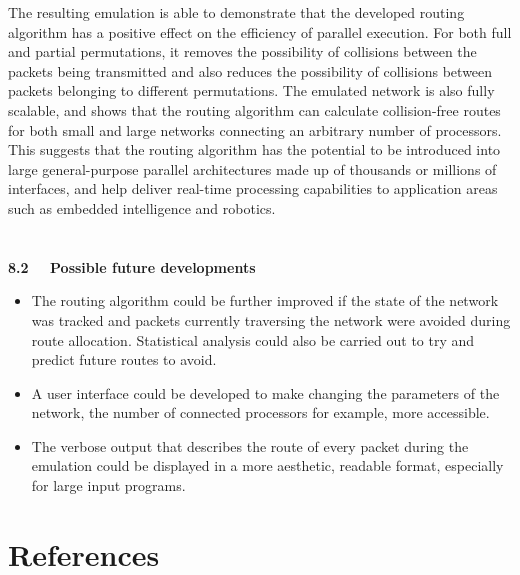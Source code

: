 \documentclass[a4paper, 12pt]{article}
\begin{document}
The resulting emulation is able to demonstrate that the developed routing algorithm has a positive effect on the efficiency of parallel execution. For both full and partial permutations, it removes the possibility of collisions between the packets being transmitted and also reduces the possibility of collisions between packets belonging to different permutations. The emulated network is also fully scalable, and shows that the routing algorithm can calculate collision-free routes for both small and large networks connecting an arbitrary number of processors. This suggests that the routing algorithm has the potential to be introduced into large general-purpose parallel architectures made up of thousands or millions of interfaces, and help deliver real-time processing capabilities to application areas such as embedded intelligence and robotics.\\ \ \\ \ \\
\noindent\textbf{\large 8.2 \ \ Possible future developments}
\vspace{-1mm}
\begin{itemize}[leftmargin=*]
	\item The routing algorithm could be further improved if the state of the network was tracked and packets currently traversing the network were avoided during route allocation. Statistical analysis could also be carried out to try and predict future routes to avoid.
	\item A user interface could be developed to make changing the parameters of the network, the number of connected processors for example, more accessible.
	\item The verbose output that describes the route of every packet during the emulation could be displayed in a more aesthetic, readable format, especially for large input programs. 
\end{itemize}

\newpage
\section{References}
\end{document}
